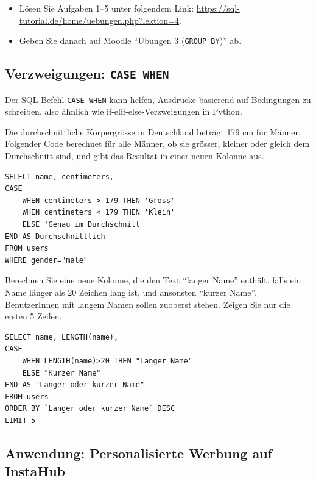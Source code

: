 \begin{mysubmission}
  \begin{itemize}
    \item Lösen Sie Aufgaben 1--5 unter folgendem Link: \url{https://sql-tutorial.de/home/uebungen.php?lektion=4}.   
    \item Geben Sie danach auf Moodle ``Übungen 3 (\lstinline|GROUP BY|)'' ab.
  \end{itemize}
\end{mysubmission}

\subsection{Verzweigungen: \texorpdfstring{\lstinline|CASE WHEN|}{CASE WHEN}}

Der SQL-Befehl \lstinline|CASE WHEN| kann helfen, Ausdrücke basierend auf Bedingungen zu schreiben, also ähnlich wie if-elif-else-Verzweigungen in Python.

\begin{myexample}
Die durchschnittliche Körpergrösse in Deutschland beträgt 179 cm für Männer. Folgender Code berechnet für alle Männer, ob sie grösser, kleiner oder gleich dem Durchschnitt sind, und gibt das Resultat in einer neuen Kolonne aus.

\begin{lstlisting}
SELECT name, centimeters,
CASE 
	WHEN centimeters > 179 THEN 'Gross'
    WHEN centimeters < 179 THEN 'Klein'
    ELSE 'Genau im Durchschnitt'
END AS Durchschnittlich
FROM users
WHERE gender="male"
\end{lstlisting}
\end{myexample}

\begin{myexercise}
  Berechnen Sie eine neue Kolonne, die den Text ``langer Name'' enthält, falls ein Name länger als 20 Zeichen lang ist, und ansonsten ``kurzer Name''. BenutzerInnen mit langem Namen sollen zuoberst stehen. Zeigen Sie nur die ersten 5 Zeilen.
  \begin{myanswer}
    \begin{lstlisting}
SELECT name, LENGTH(name),
CASE
	WHEN LENGTH(name)>20 THEN "Langer Name"
    ELSE "Kurzer Name"
END AS "Langer oder kurzer Name"
FROM users
ORDER BY `Langer oder kurzer Name` DESC
LIMIT 5
\end{lstlisting}
  \end{myanswer}
\end{myexercise}

\subsection{Anwendung: Personalisierte Werbung auf InstaHub}

